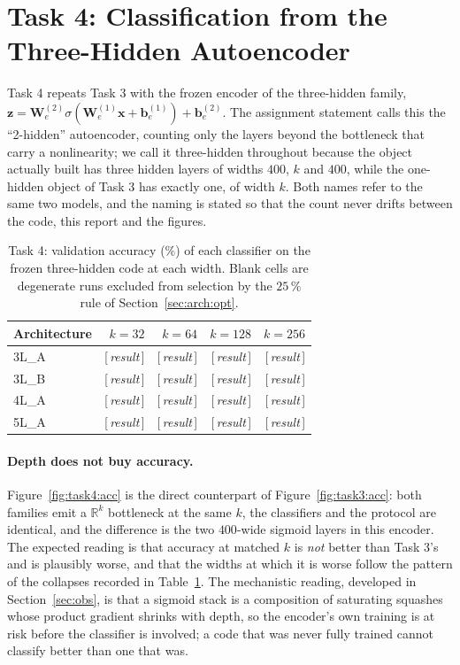 \documentclass[11pt,a4paper]{article}
\newcommand{\R}{\mathbb{R}}\newcommand{\given}{\mid}\newcommand{\Acc}{\mathrm{Acc}}
\newcommand{\RESULT}{\textrm{[\,\textit{result}\,]}}     %
\begin{document}
\section{Task 4: Classification from the Three-Hidden Autoencoder}\label{sec:task4}
Task 4 repeats Task 3 with the frozen encoder of the three-hidden family,
$\mathbf{z}=\mathbf{W}_e^{(2)}\sigma(\mathbf{W}_e^{(1)}\mathbf{x}+\mathbf{b}_e^{(1)})+
\mathbf{b}_e^{(2)}$.  The assignment statement calls this the ``2-hidden'' autoencoder, counting
only the layers beyond the bottleneck that carry a nonlinearity; we call it three-hidden throughout
because the object actually built has three hidden layers of widths $400$, $k$ and $400$, while the
one-hidden object of Task 3 has exactly one, of width $k$.  Both names refer to the same two models,
and the naming is stated so that the count never drifts between the code, this report and the
figures.

\begin{table}[htbp]\centering
\caption{Task 4: validation accuracy (\%) of each classifier on the frozen three-hidden code at
each width.  Blank cells are degenerate runs excluded from selection by the $25\,\%$ rule of
Section~\ref{sec:arch:opt}.}\label{tab:task4}
\begin{tabular}{@{}lrrrr@{}}
\toprule Architecture & $k=32$ & $k=64$ & $k=128$ & $k=256$ \\ \midrule
3L\_A & \RESULT & \RESULT & \RESULT & \RESULT \\
3L\_B & \RESULT & \RESULT & \RESULT & \RESULT \\
4L\_A & \RESULT & \RESULT & \RESULT & \RESULT \\
5L\_A & \RESULT & \RESULT & \RESULT & \RESULT \\
\bottomrule
\end{tabular}
\end{table}


\paragraph{Depth does not buy accuracy.}
Figure~\ref{fig:task4:acc} is the direct counterpart of Figure~\ref{fig:task3:acc}: both families
emit a $\R^{k}$ bottleneck at the same $k$, the classifiers and the protocol are identical, and the
difference is the two $400$-wide sigmoid layers in this encoder.  The expected reading is that
accuracy at matched $k$ is \emph{not} better than Task 3's and is plausibly worse, and that the
widths at which it is worse follow the pattern of the collapses recorded in Table~\ref{tab:task4}.
The mechanistic reading, developed in Section~\ref{sec:obs}, is that a sigmoid stack is a
composition of saturating squashes whose product gradient shrinks with depth, so the encoder's own
training is at risk before the classifier is involved; a code that was never fully trained cannot
classify better than one that was.
\end{document}

